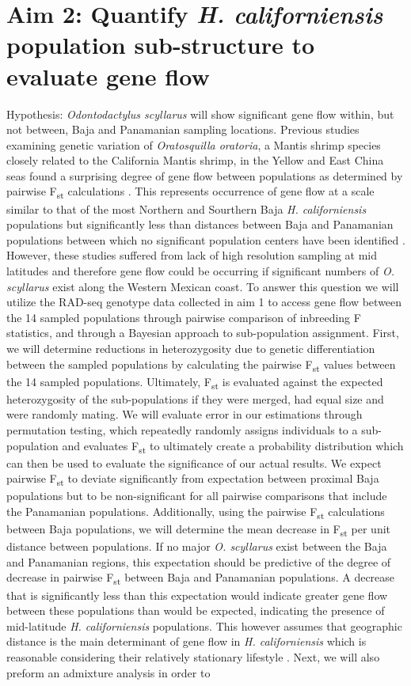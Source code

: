 \documentclass[11pt]{article}
\begin{document}
\section*{Aim 2: Quantify \emph{H. californiensis} population sub-structure to evaluate gene flow}
Hypothesis: \emph{Odontodactylus scyllarus} will show significant gene flow within, but not between, Baja and Panamanian sampling locations. Previous studies examining genetic variation of \emph{Oratosquilla oratoria}, a Mantis shrimp species closely related to the California Mantis shrimp, in the Yellow and East China seas found a surprising degree of gene flow between populations as determined by pairwise F\textsubscript{st} calculations \cite{Yang2018}. This represents occurrence of gene flow at a scale similar to that of the most Northern and Sourthern Baja \emph{H. californiensis} populations but significantly less than distances between Baja and Panamanian populations between which no significant population centers have been identified \cite{Basch1993BiogeographyOH}. However, these studies suffered from lack of high resolution sampling at mid latitudes and therefore gene flow could be occurring if significant numbers of \emph{O. scyllarus} exist along the Western Mexican coast. To answer this question we will utilize the RAD-seq genotype data collected in aim 1 to access gene flow between the 14 sampled populations through pairwise comparison of inbreeding F statistics, and through a Bayesian approach to sub-population assignment. First, we will determine reductions in heterozygosity due to genetic differentiation between the sampled populations by calculating the pairwise F\textsubscript{st} values between the 14 sampled populations. Ultimately, F\textsubscript{st} is evaluated against the expected heterozygosity of the sub-populations if they were merged, had equal size and were randomly mating. We will evaluate error in our estimations through permutation testing, which repeatedly randomly assigns individuals to a sub-population and evaluates  F\textsubscript{st} to ultimately create a probability distribution which can then be used to evaluate the significance of our actual results. We expect pairwise F\textsubscript{st} to deviate significantly from expectation between proximal Baja populations but to be non-significant for all pairwise comparisons that include the Panamanian populations. Additionally, using the pairwise F\textsubscript{st} calculations between Baja populations, we will determine the mean decrease in F\textsubscript{st} per unit distance between populations. If no major \emph{O. scyllarus} exist between the Baja and Panamanian regions, this expectation should be predictive of the degree of decrease in pairwise F\textsubscript{st} between Baja and Panamanian populations. A decrease that is significantly less than this expectation would indicate greater gene flow between these populations than would be expected, indicating the presence of mid-latitude \emph{H. californiensis} populations. This however assumes that geographic distance is the main determinant of gene flow in \emph{H. californiensis} which is reasonable considering their relatively stationary lifestyle \cite{Reaka1980}. Next, we will also preform an admixture analysis in order to 
\end{document}
